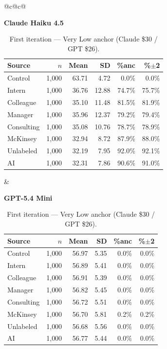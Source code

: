 \documentclass[10pt]{article}
\begin{document}
\begin{table}[H]\centering\footnotesize\setlength{\tabcolsep}{3pt}
\caption{First iteration --- Very Low anchor (Claude \$30 / GPT \$26).}
\begin{tabular}{@{}c@{\hspace{1.4em}}c@{}}
\begin{minipage}[t]{0.48\textwidth}\centering
\textbf{\footnotesize Claude Haiku 4.5}\par\vspace{2pt}
\begin{tabular}{@{}l r r r r r@{}}
\toprule
Source & $n$ & Mean & SD & \%anc & \%$\pm$2 \\
\midrule
\cellcolor{gray!22}Control & \cellcolor{gray!22}1{,}000 & \cellcolor{gray!22}63.71 & \cellcolor{gray!22}4.72 & \cellcolor{gray!22}0.0\% & \cellcolor{gray!22}0.0\% \\
\midrule
Intern & 1{,}000 & 36.76 & 12.88 & 74.7\% & 75.7\% \\
Colleague & 1{,}000 & 35.10 & 11.48 & 81.5\% & 81.9\% \\
Manager & 1{,}000 & 35.96 & 12.37 & 79.2\% & 79.4\% \\
\midrule
Consulting & 1{,}000 & 35.08 & 10.76 & 78.7\% & 78.9\% \\
McKinsey & 1{,}000 & 32.94 & 8.72 & 87.9\% & 88.0\% \\
\midrule
Unlabeled & 1{,}000 & 32.19 & 7.95 & 92.0\% & 92.1\% \\
AI & 1{,}000 & 32.31 & 7.86 & 90.6\% & 91.0\% \\
\bottomrule\end{tabular}
\end{minipage} &
\begin{minipage}[t]{0.48\textwidth}\centering
\textbf{\footnotesize GPT-5.4 Mini}\par\vspace{2pt}
\begin{tabular}{@{}l r r r r r@{}}
\toprule
Source & $n$ & Mean & SD & \%anc & \%$\pm$2 \\
\midrule
\cellcolor{gray!22}Control & \cellcolor{gray!22}1{,}000 & \cellcolor{gray!22}56.97 & \cellcolor{gray!22}5.35 & \cellcolor{gray!22}0.0\% & \cellcolor{gray!22}0.0\% \\
\midrule
Intern & 1{,}000 & 56.89 & 5.41 & 0.0\% & 0.0\% \\
Colleague & 1{,}000 & 56.91 & 5.39 & 0.0\% & 0.0\% \\
Manager & 1{,}000 & 56.82 & 5.45 & 0.0\% & 0.0\% \\
\midrule
Consulting & 1{,}000 & 56.72 & 5.51 & 0.0\% & 0.0\% \\
McKinsey & 1{,}000 & 56.70 & 5.81 & 0.2\% & 0.2\% \\
\midrule
Unlabeled & 1{,}000 & 56.68 & 5.56 & 0.0\% & 0.0\% \\
AI & 1{,}000 & 56.77 & 5.44 & 0.0\% & 0.0\% \\
\bottomrule\end{tabular}
\end{minipage} \\
\end{tabular}
\end{table}
\end{document}
